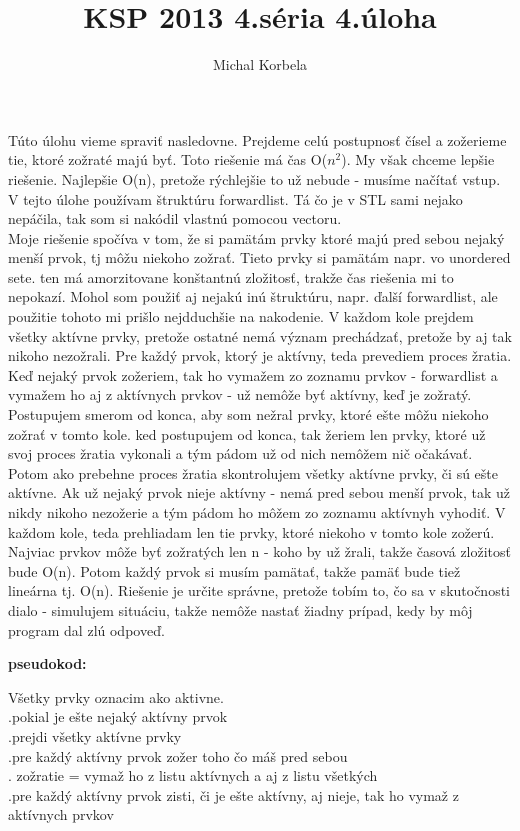 \documentclass[a4paper,11pt]{article}
\title{KSP 2013 4.séria 4.úloha}
\author{Michal Korbela}
\begin{document}
Túto úlohu vieme spraviť nasledovne. Prejdeme celú postupnosť čísel a zožerieme tie, ktoré zožraté majú byť. Toto riešenie má čas O($n^2$). My však chceme lepšie riešenie. Najlepšie O(n), pretože rýchlejšie to už nebude - musíme načítať vstup.
V tejto úlohe používam štruktúru forwardlist. Tá čo je v STL sami nejako nepáčila, tak som si nakódil vlastnú pomocou vectoru.\\
Moje riešenie spočíva v tom, že si pamätám prvky ktoré majú pred sebou nejaký menší prvok, tj môžu niekoho zožrať. Tieto prvky si pamätám napr. vo unordered sete. ten má amorzitovane konštantnú zložitosť, trakže čas riešenia mi to nepokazí. Mohol som použiť aj nejakú inú štruktúru, napr. ďalší forwardlist, ale použitie tohoto mi prišlo nejdduchšie na nakodenie.
V každom kole prejdem všetky aktívne prvky, pretože ostatné nemá význam prechádzať, pretože by aj tak nikoho nezožrali. Pre každý prvok, ktorý je aktívny, teda prevediem proces žratia. Keď nejaký prvok zožeriem, tak ho vymažem zo zoznamu prvkov - forwardlist a vymažem ho aj z aktívnych prvkov - už nemôže byť aktívny, keď je zožratý. Postupujem smerom od konca, aby som nežral prvky, ktoré ešte môžu niekoho zožrať v tomto kole. ked postupujem od konca, tak žeriem len prvky, ktoré už svoj proces žratia vykonali a tým pádom už od nich nemôžem nič očakávať. Potom ako prebehne proces žratia skontrolujem všetky aktívne prvky, či sú ešte aktívne. Ak už nejaký prvok nieje aktívny - nemá pred sebou menší prvok, tak už nikdy nikoho nezožerie a tým pádom ho môžem zo zoznamu aktívnyh vyhodiť. 
V každom kole, teda prehliadam len tie prvky, ktoré niekoho v tomto kole zožerú. Najviac prvkov môže byť zožratých len n - koho by už žrali, takže časová zložitosť bude O(n). Potom každý prvok si musím pamätať, takže pamäť bude tiež lineárna tj. O(n).
Riešenie je určite správne, pretože tobím to, čo sa v skutočnosti dialo - simulujem situáciu, takže nemôže nastať žiadny prípad, kedy by môj program dal zlú odpoveď.

\textbf{pseudokod:}

Všetky prvky oznacim ako aktivne.\\
.\hspace{40pt}pokial je ešte nejaký aktívny prvok\\
.\hspace{70pt}prejdi všetky aktívne prvky\\
.\hspace{100pt}pre každý aktívny prvok zožer toho čo máš pred sebou\\
.\hspace{100pt} zožratie  = vymaž ho z listu aktívnych a aj z listu všetkých\\
.\hspace{50pt}pre každý aktívny prvok	zisti, či je ešte aktívny, aj nieje, tak ho vymaž z aktívnych prvkov
			
\end{document}
